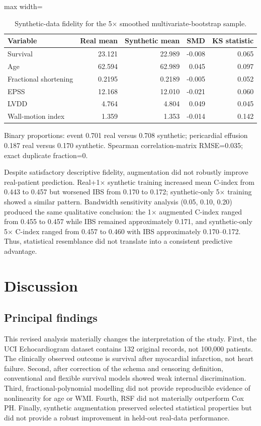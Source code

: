 \documentclass[a4paper,12pt]{article}
\begin{document}
\begin{table}[H]
\centering
\caption{Synthetic-data fidelity for the 5$\times$ smoothed multivariate-bootstrap sample.}
\label{tab:synthfidelity}
\begin{adjustbox}{max width=\linewidth}
\begin{tabular}{lrrrr}
\toprule
Variable & Real mean & Synthetic mean & SMD & KS statistic \\
\midrule
Survival & 23.121 & 22.989 & -0.008 & 0.065 \\
Age & 62.594 & 62.989 & 0.045 & 0.097 \\
Fractional shortening & 0.2195 & 0.2189 & -0.005 & 0.052 \\
EPSS & 12.168 & 12.010 & -0.021 & 0.060 \\
LVDD & 4.764 & 4.804 & 0.049 & 0.045 \\
Wall-motion index & 1.359 & 1.353 & -0.014 & 0.142 \\
\bottomrule
\end{tabular}
\end{adjustbox}
\vspace{2mm}
\small Binary proportions: event 0.701 real versus 0.708 synthetic; pericardial effusion 0.187 real versus 0.170 synthetic. Spearman correlation-matrix RMSE=0.035; exact duplicate fraction=0.
\end{table}

Despite satisfactory descriptive fidelity, augmentation did not robustly improve real-patient prediction. Real+1$\times$ synthetic training increased mean C-index from 0.443 to 0.457 but worsened IBS from 0.170 to 0.172; synthetic-only 5$\times$ training showed a similar pattern. Bandwidth sensitivity analysis (0.05, 0.10, 0.20) produced the same qualitative conclusion: the 1$\times$ augmented C-index ranged from 0.455 to 0.457 while IBS remained approximately 0.171, and synthetic-only 5$\times$ C-index ranged from 0.457 to 0.460 with IBS approximately 0.170--0.172. Thus, statistical resemblance did not translate into a consistent predictive advantage.

\section{Discussion}
\subsection{Principal findings}
This revised analysis materially changes the interpretation of the study. First, the UCI Echocardiogram dataset contains 132 original records, not 100,000 patients. The clinically observed outcome is survival after myocardial infarction, not heart failure. Second, after correction of the schema and censoring definition, conventional and flexible survival models showed weak internal discrimination. Third, fractional-polynomial modelling did not provide reproducible evidence of nonlinearity for age or WMI. Fourth, RSF did not materially outperform Cox PH. Finally, synthetic augmentation preserved selected statistical properties but did not provide a robust improvement in held-out real-data performance.
\end{document}
